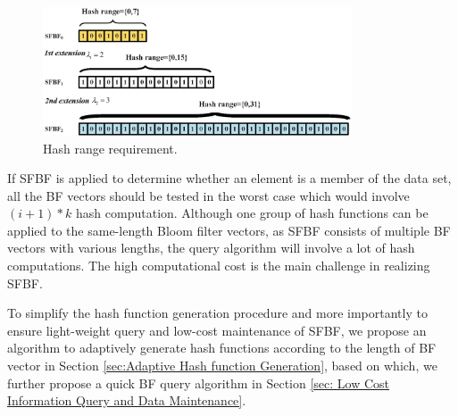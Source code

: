 \documentclass[10pt,journal,letterpaper]{IEEEtran}
\begin{document}
\begin{figure}[!h]
\centering
\includegraphics[width=3.6in]{fig/HashRange}
\caption{Hash range requirement.}
\label{fig:Hash range requirement.}
\end{figure}

If SFBF is applied to determine whether an element  is  a member of the data set, all the BF vectors should be tested in the worst case which would involve $(i+1)*k$ hash computation. Although one group of hash functions can be applied to the same-length Bloom filter vectors, as SFBF consists of multiple BF vectors with various lengths, the query algorithm will involve a lot of hash computations. The high computational cost is the main challenge in realizing SFBF.




To simplify the hash function generation procedure and more importantly to ensure light-weight query and low-cost maintenance of  SFBF, we propose an algorithm to adaptively generate hash functions according to the length of BF vector  in Section \ref{sec:Adaptive Hash function Generation}, based on which, we further propose a quick BF query algorithm in Section \ref{sec: Low Cost Information Query and Data Maintenance}.

\end{document}
